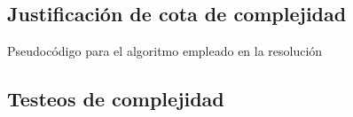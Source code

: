 \documentclass[11pt, a4paper, twoside]{article}
\begin{document}
\newpage
\subsection{Justificación de cota de complejidad}

\begin{algorithm}[H]

\caption{Pseudocódigo para el algoritmo empleado en la resolución}
\end{algorithm}

\subsection{Testeos de complejidad}



\end{document}
